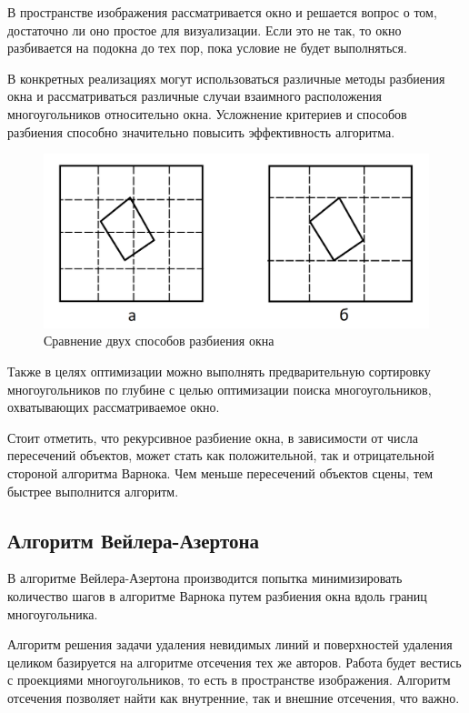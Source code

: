 В пространстве изображения рассматривается окно и решается вопрос о том, достаточно ли оно простое для визуализации. Если это не так, то окно разбивается на подокна до тех пор, пока условие не будет выполняться. 

В конкретных реализациях могут использоваться различные методы разбиения окна и рассматриваться различные случаи взаимного расположения многоугольников относительно окна. Усложнение критериев и способов разбиения способно значительно повысить эффективность алгоритма. 

\begin{figure}[h]
	\centering
	\includegraphics[width=\textwidth ]{img/subdivide_1.png}
	\caption{Сравнение двух способов разбиения окна}
\end{figure} 

Также в целях оптимизации можно выполнять предварительную сортировку многоугольников по глубине с целью оптимизации поиска многоугольников, охватывающих рассматриваемое окно.

Стоит отметить, что рекурсивное разбиение окна, в зависимости от числа пересечений объектов, может стать как положительной, так и отрицательной стороной алгоритма Варнока. Чем меньше пересечений объектов сцены, тем быстрее выполнится алгоритм.

\subsection{Алгоритм Вейлера-Азертона}
В алгоритме Вейлера-Азертона производится попытка минимизировать количество шагов в алгоритме Варнока путем разбиения окна вдоль границ многоугольника.

Алгоритм решения задачи удаления невидимых линий и поверхностей удаления целиком базируется на алгоритме отсечения тех же авторов. Работа будет вестись с проекциями многоугольников, то есть в пространстве изображения. Алгоритм отсечения позволяет найти как внутренние, так и внешние отсечения, что важно.

